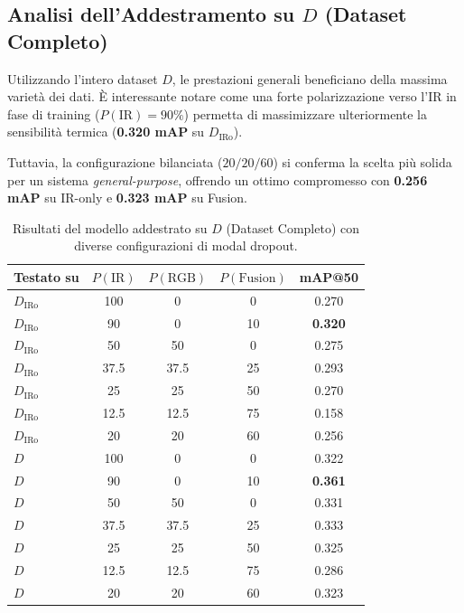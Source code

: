 \documentclass[a4paper,12pt]{article}
\begin{document}
\subsection{Analisi dell'Addestramento su \texorpdfstring{$D$}{D} (Dataset Completo)}

Utilizzando l'intero dataset $D$, le prestazioni generali beneficiano della massima varietà dei dati. È interessante notare come una forte polarizzazione verso l'IR in fase di training ($P(\text{IR})=90\%$) permetta di massimizzare ulteriormente la sensibilità termica (\textbf{0.320 mAP} su $D_{\text{IRo}}$).

Tuttavia, la configurazione bilanciata ($20/20/60$) si conferma la scelta più solida per un sistema \textit{general-purpose}, offrendo un ottimo compromesso con \textbf{0.256 mAP} su IR-only e \textbf{0.323 mAP} su Fusion.

\begin{table}[H]
\centering
\caption{Risultati del modello addestrato su $D$ (Dataset Completo) con diverse configurazioni di modal dropout.}
\label{tab:all_train}
\begin{tabular}{lcccc}
\toprule
Testato su & $P(\text{IR})$ & $P(\text{RGB})$ & $P(\text{Fusion})$ & mAP@50 \\
\midrule
$D_{\text{IRo}}$ & 100 & 0 & 0 & 0.270 \\
$D_{\text{IRo}}$ & 90 & 0 & 10 & \textbf{0.320} \\
$D_{\text{IRo}}$ & 50 & 50 & 0 & 0.275 \\
$D_{\text{IRo}}$ & 37.5 & 37.5 & 25 & 0.293 \\
$D_{\text{IRo}}$ & 25 & 25 & 50 & 0.270 \\
$D_{\text{IRo}}$ & 12.5 & 12.5 & 75 & 0.158 \\
$D_{\text{IRo}}$ & 20 & 20 & 60 & 0.256 \\
\midrule
$D$ & 100 & 0 & 0 & 0.322 \\
$D$ & 90 & 0 & 10 & \textbf{0.361} \\
$D$ & 50 & 50 & 0 & 0.331 \\
$D$ & 37.5 & 37.5 & 25 & 0.333 \\
$D$ & 25 & 25 & 50 & 0.325 \\
$D$ & 12.5 & 12.5 & 75 & 0.286 \\
$D$ & 20 & 20 & 60 & 0.323 \\
\bottomrule
\end{tabular}
\end{table}

\end{document}
